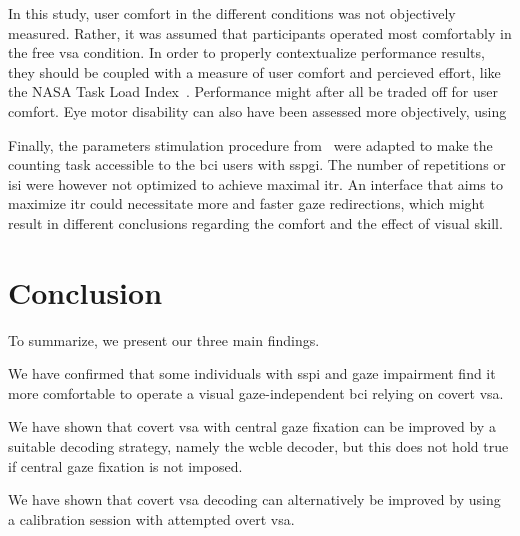 In this study, user comfort in the different conditions was not objectively
measured.
Rather, it was assumed that participants operated most comfortably in the free
\ac{vsa} condition.
In order to properly contextualize performance results, they should be coupled
with a measure of user comfort and percieved effort, like the NASA Task Load
Index~\cite{Hart2006}.
Performance might after all be traded off for user comfort.
Eye motor disability can also have been assessed more objectively, using 

Finally, the parameters stimulation procedure
from~\textcite{VanDenKerchove2024} were adapted to make the counting task
accessible to the \ac{bci} users with \ac{sspgi}.
The number of repetitions or \ac{isi} were however not optimized to achieve
maximal \ac{itr}.
An interface that aims to maximize \ac{itr} could necessitate more and faster
gaze redirections, which might result in different conclusions regarding the
comfort and the effect of visual skill.

\section{Conclusion}

To summarize, we present our three main findings.
\begin{enumerate*}
  \item We have confirmed that some individuals with \ac{sspi} and gaze
    impairment find it more comfortable to operate a visual gaze-independent
    \ac{bci} relying on covert \acf{vsa}.
  \item We have shown that covert \acf{vsa} with central gaze fixation can be
    improved by a suitable decoding strategy, namely the \acf{wcble} decoder,
    but this does not hold true if central gaze fixation is not imposed.
  \item We have shown that covert \ac{vsa}
    decoding can alternatively be improved by
    using a calibration session with attempted overt \ac{vsa}.
\end{enumerate*} 

